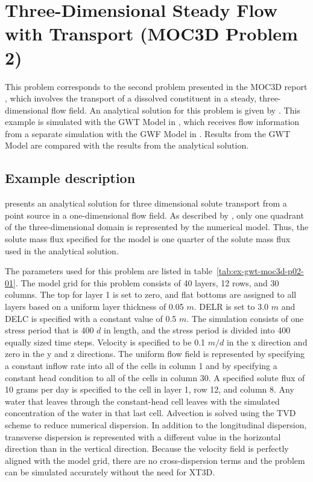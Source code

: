\section{Three-Dimensional Steady Flow with Transport (MOC3D Problem 2)}

This problem corresponds to the second problem presented in the MOC3D report \cite{konikow1996three}, which involves the transport of a dissolved constituent in a steady, three-dimensional flow field.  An analytical solution for this problem is given by \cite{wexler1992}.  This example is simulated with the GWT Model in \mf, which receives flow information from a separate simulation with the GWF Model in \mf.  Results from the GWT Model are compared with the results from the \cite{wexler1992} analytical solution.

\subsection{Example description}
\cite{wexler1992} presents an analytical solution for three dimensional solute transport from a point source in a one-dimensional flow field.  As described by \cite{konikow1996three}, only one quadrant of the three-dimensional domain is represented by the numerical model.  Thus, the solute mass flux specified for the model is one quarter of the solute mass flux used in the analytical solution.  

The parameters used for this problem are listed in table~\ref{tab:ex-gwt-moc3d-p02-01}.  The model grid for this problem consists of 40 layers, 12 rows, and 30 columns.  The top for layer 1 is set to zero, and flat bottoms are assigned to all layers based on a uniform layer thickness of 0.05 $m$.  DELR is set to 3.0 $m$ and DELC is specified with a constant value of 0.5 $m$.  The simulation consists of one stress period that is 400 $d$ in length, and the stress period is divided into 400 equally sized time steps.  Velocity is specified to be 0.1 $m/d$ in the x direction and zero in the y and z directions.  The uniform flow field is represented by specifying a constant inflow rate into all of the cells in column 1 and by specifying a constant head condition to all of the cells in column 30.  A specified solute flux of 10 grams per day is specified to the cell in layer 1, row 12, and column 8.  Any water that leaves through the constant-head cell leaves with the simulated concentration of the water in that last cell.   Advection is solved using the TVD scheme to reduce numerical dispersion.  In addition to the longitudinal dispersion, transverse dispersion is represented with a different value in the horizontal direction than in the vertical direction.  Because the velocity field is perfectly aligned with the model grid, there are no cross-dispersion terms and the problem can be simulated accurately without the need for XT3D.

